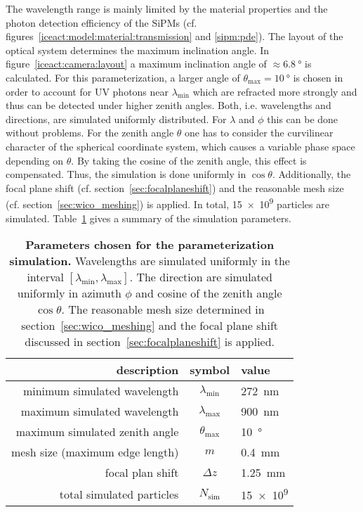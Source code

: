 The wavelength range is mainly limited by the material properties and the photon detection efficiency of the SiPMs (cf. figures~\ref{iceact:model:material:transmission} and \ref{sipm:pde}). The layout of the optical system determines the maximum inclination angle. In figure~\ref{iceact:camera:layout} a maximum inclination angle of $\approx\SI{6.8}{\degree}$ is calculated. For this parameterization, a larger angle of $\theta_\text{max}=\SI{10}{\degree}$ is chosen in order to account for UV photons near $\lambda_\text{min}$  which are refracted more strongly and thus can be detected under higher zenith angles. Both, i.e. wavelengths and directions, are simulated uniformly distributed. For $\lambda$ and $\phi$ this can be done without problems. For the zenith angle $\theta$ one has to consider the curvilinear character of the spherical coordinate system, which causes a variable phase space depending on $\theta$. By taking the cosine of the zenith angle, this effect is compensated. Thus, the simulation is done uniformly in $\cos{\theta}$. Additionally, the focal plane shift (cf. section~\ref{sec:focalplaneshift}) and the reasonable mesh size (cf. section~\ref{sec:wico_meshing}) is applied. In total, \num{15e9} particles are simulated. Table~\ref{paramsim:params} gives a summary of the simulation parameters.

\begin{table}[H]
	\centering
	\begin{tabular}{r|c|l}
		\toprule
		description 				   & symbol               & value\\
		\midrule
		minimum simulated wavelength   & $\lambda_\text{min}$ & \SI{272}{\nano\meter}\\
		maximum simulated wavelength   & $\lambda_\text{max}$ & \SI{900}{\nano\meter}\\
		maximum simulated zenith angle & $\theta_\text{max}$  & \SI{10}{\degree}\\
		mesh size (maximum edge length)& $m$				  & \SI{0.4}{\milli\meter}\\
		focal plan shift 			   & $\Delta z$			  & \SI{1.25}{\milli\meter}\\
		total simulated particles      & $N_\text{sim}$		  & \num{15e9}\\
		\bottomrule
	\end{tabular}
	\caption[Parameters chosen for the parameterization simulation]{\textbf{Parameters chosen for the parameterization simulation.} Wavelengths are simulated uniformly in the interval $[\lambda_\text{min}, \lambda_\text{max}]$. The direction are simulated uniformly in azimuth $\phi$ and cosine of the zenith angle $\cos{\theta}$. The reasonable mesh size determined in section~\ref{sec:wico_meshing} and the focal plane shift discussed in section~\ref{sec:focalplaneshift} is applied.}
	\label{paramsim:params}
\end{table}

